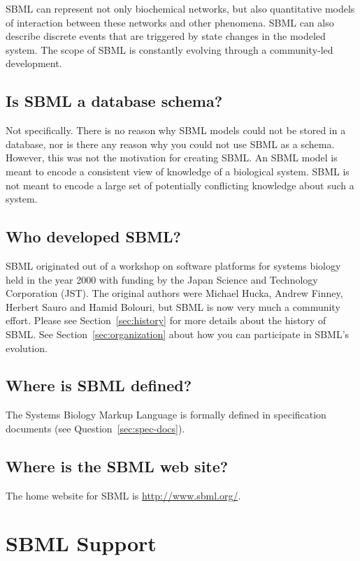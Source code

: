 \documentclass{sbmlfaq}
\begin{document}
SBML can represent not only biochemical networks, but also quantitative
models of interaction between these networks and other phenomena.  SBML can
also describe discrete events that are triggered by state changes in the
modeled system.  The scope of SBML is constantly evolving through a
community-led development.

\subsection{Is SBML a database schema?}

Not specifically.  There is no reason why SBML models could not be stored
in a database, nor is there any reason why you could not use SBML as a
schema.  However, this was not the motivation for creating SBML.  An SBML
model is meant to encode a consistent view of knowledge of a biological
system.  SBML is not meant to encode a large set of potentially conflicting
knowledge about such a system.

\subsection{Who developed SBML?}

SBML originated out of a workshop on software platforms for systems biology
held in the year 2000 with funding by the Japan Science and Technology
Corporation (JST).  The original authors were Michael Hucka, Andrew Finney,
Herbert Sauro and Hamid Bolouri, but SBML is now very much a community
effort.  Please see Section~\ref{sec:history} for more details about the
history of SBML.  See Section~\ref{sec:organization} about how you can
participate in SBML's evolution.

\subsection{Where is SBML defined?}

The Systems Biology Markup Language is formally defined in specification
documents (see Question~\ref{sec:spec-docs}).

\subsection{Where is the SBML web site?}

The home website for SBML is \url{http://www.sbml.org/}.


\section{SBML Support}
\label{sec:sbml-support}
\end{document}
